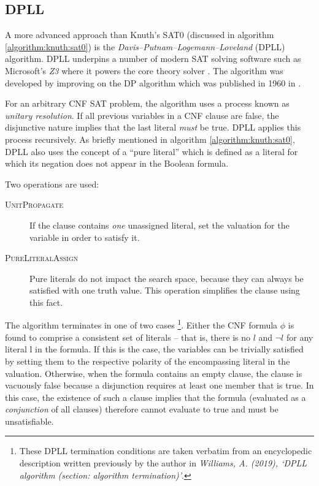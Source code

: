 \documentclass[a4paper,openany]{book}
\begin{document}
\subsection{DPLL}

A more advanced approach than Knuth's SAT0 (discussed in algorithm \ref{algorithm:knuth:sat0}) is the \emph{Davis–Putnam–Logemann–Loveland} (DPLL) algorithm. DPLL underpins a number of modern SAT solving software such as Microsoft's \emph{Z3} where it powers the core theory solver \citep{de2008z3}. The algorithm was developed by improving on the DP algorithm which was published in 1960 in \citet{Davis:1960:CPQ:321033.321034}.

For an arbitrary CNF SAT problem, the algorithm uses a process known as \emph{unitary resolution}. If all previous variables in a CNF clause are false, the disjunctive nature implies that the last literal \emph{must} be true. DPLL applies this process recursively. As briefly mentioned in algorithm \ref{algorithm:knuth:sat0}, DPLL also uses the concept of a ``pure literal'' which is defined as a literal for which its negation does not appear in the Boolean formula.

Two operations are used:

\begin{description}
	\item[\textsc{UnitPropagate}] If the clause contains \emph{one} unassigned literal, set the valuation for the variable in order to satisfy it.
	\item[\textsc{PureLiteralAssign}] Pure literals do not impact the search space, because they can always be satisfied with one truth value. This operation simplifies the clause using this fact.
\end{description}

The algorithm terminates in one of two cases \footnote{These DPLL termination conditions are taken verbatim from an encyclopedic description written previously by the author in \emph{Williams, A. (2019), `DPLL algorithm (section: algorithm termination)'}.}. Either the CNF formula $\phi$ is found to comprise a consistent set of literals -- that is, there is no $l$ and $\neg l$ for any literal l in the formula. If this is the case, the variables can be trivially satisfied by setting them to the respective polarity of the encompassing literal in the valuation. Otherwise, when the formula contains an empty clause, the clause is vacuously false because a disjunction requires at least one member that is true. In this case, the existence of such a clause implies that the formula (evaluated as a \emph{conjunction} of all clauses) therefore cannot evaluate to true and must be unsatisfiable.
\end{document}
